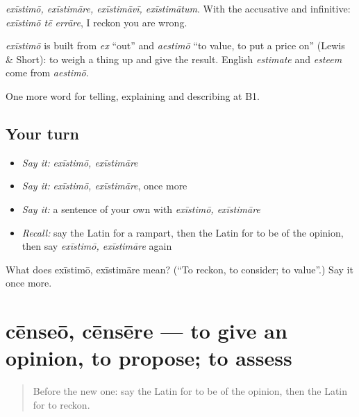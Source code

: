 \emph{exīstimō, exīstimāre, exīstimāvī, exīstimātum}. With the accusative and infinitive: \emph{exīstimō tē errāre}, I reckon you are wrong.

\begin{cousinweb}
\emph{exīstimō} is built from \emph{ex} \textquotedblleft{}out\textquotedblright{} and \emph{aestimō} \textquotedblleft{}to value, to put a price on\textquotedblright{} (Lewis \& Short): to weigh a thing up and give the result. English \emph{estimate} and \emph{esteem} come from \emph{aestimō}.
\end{cousinweb}

\begin{grammarlens}[title={What you've built}]
One more word for telling, explaining and describing at B1.
\end{grammarlens}

\subsection*{Your turn}
\begin{itemize}
\raggedright
  \item \emph{Say it:} \emph{exīstimō, exīstimāre}
  \item \emph{Say it:} \emph{exīstimō, exīstimāre}, once more
  \item \emph{Say it:} a sentence of your own with \emph{exīstimō, exīstimāre}
  \item \emph{Recall:} say the Latin for a rampart, then the Latin for to be of the opinion, then say \emph{exīstimō, exīstimāre} again
\end{itemize}

\begin{tcolorbox}[breakable,colback=teal!4,colframe=teal!35!black,title={Before you move on}]
What does exīstimō, exīstimāre mean? (\textquotedblleft{}To reckon, to consider; to value\textquotedblright{}.) Say it once more.
\end{tcolorbox}
\section[cēnseō, cēnsēre]{cēnseō, cēnsēre — to give an opinion, to propose; to assess}

\label{lesson:LA-C357-censeo}



\begin{quote}
Before the new one: say the Latin for to be of the opinion, then the Latin for to reckon.
\end{quote}

